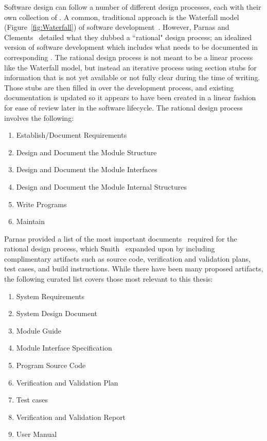 Software design can follow a number of different design processes, each with 
their own collection of \sfs{}. A common, traditional approach is the Waterfall 
model (Figure~\ref{fig:Waterfall}) of software 
development~\cite{PfleegerAndAtlee2010Ch2}. 
However, Parnas and Clements~\cite{ParnasAndClements1986} detailed what they 
dubbed a ``rational" design process; an idealized version of software 
development which includes what needs to be documented in corresponding \sfs{}.
The rational design process is not meant to be a linear process like the 
Waterfall model, but instead an iterative process using section stubs for 
information that is not yet available or not fully clear during the time of 
writing. Those stubs are then filled in over the development process, and 
existing documentation is updated so it appears to have been created in a 
linear fashion for ease of review later in the software lifecycle. The rational 
design process involves the following:

\begin{enumerate}
\item Establish/Document Requirements
\item Design and Document the Module Structure
\item Design and Document the Module Interfaces
\item Design and Document the Module Internal Structures
\item Write Programs
\item Maintain
\end{enumerate}

Parnas provided a list of the most important documents~\cite{Parnas2010} 
required for the rational design process, which 
Smith~\cite{SmithAndKoothoor2016} expanded upon by including complimentary 
artifacts such as source code, verification and validation plans, test cases, 
and build instructions. While there have been many proposed artifacts, the 
following curated list covers those most relevant to this thesis:

\begin{enumerate}
\item System Requirements
\item System Design Document
\item Module Guide
\item Module Interface Specification
\item Program Source Code
\item Verification and Validation Plan
\item Test cases
\item Verification and Validation Report
\item User Manual
\end{enumerate}

